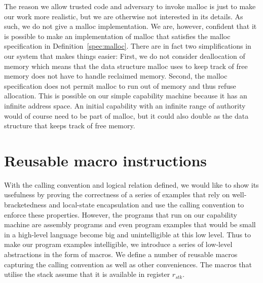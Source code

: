 \documentclass[format=acmsmall, review=true, screen=true]{acmart}
\newcommand{\var}[1]{\mathit{#1}}
\newcommand{\stk}{\var{stk}}
\newenvironment{toplas}%
    {\color{OliveGreen}}{}
\newcommand{\itoplassug}[1]{}
\begin{document}
\begin{toplas}
The reason we allow trusted code and adversary to invoke malloc is just to make
our work more realistic, but we are otherwise not interested in its details. As
such, we do not give a malloc implementation. We are, however, confident that it
is possible to make an implementation of malloc that satisfies the malloc
specification in Definition~\ref{spec:malloc}. There are in fact two
simplifications in our system that makes things easier: First, we do not consider
deallocation of memory which means that the data structure malloc uses to keep
track of free memory does not have to handle reclaimed memory. Second, the
malloc specification does not permit malloc to run out of memory and thus refuse
allocation. This is possible on our simple capability machine because it has an
infinite address space. An initial capability with an infinite range of
authority would of course need to be part of malloc, but it could also double as
the data structure that keeps track of free memory. %

\section{Reusable macro instructions}
\label{sec:macros}
With the calling convention and logical relation defined, we would like to show its usefulness by proving
the correctness of a series of examples that rely
on well-bracketedness and local-state encapsulation and use the calling
convention to enforce these properties. However, the programs that
run on our capability machine are assembly programs and even program examples that would
be small in a high-level language become big and unintelligible at this
low level. Thus to make our program examples intelligible, we introduce a
series of low-level abstractions in the form of macros.
We define a number of reusable macros capturing the calling convention as well
as other conveniences. The macros that utilise the stack assume that it is
available in register $r_\stk$.
\itoplassug{Lau, suggestion: should we mention temporary registers? They are
  used in the macros, but it seems like a minor technical detail.}


\end{toplas}
\end{document}
